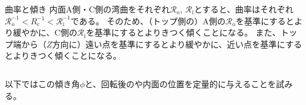 \begin{Column}{曲率と傾き}
内面A側・C側の湾曲をそれぞれ$\mathcal R_\mathrm o$, $\mathcal R_\mathrm i$とすると、曲率はそれぞれ$\mathcal R_\mathrm o^{-1} < R_\mathrm c^{-1} < \mathcal R_\mathrm i^{-1}$である。
そのため、（トップ側の）A側の$\mathcal R_\mathrm o$を基準にするとより緩やかに、C側の$\mathcal R_\mathrm i$を基準にするとよりきつく傾くことになる。
また、トップ端から（$Z$方向に）遠い点を基準にするとより緩やかに、近い点を基準にするとよりきつく傾くことになる。
\end{Column}

以下ではこの傾き角$\phi$と、回転後の\dimple や内面の位置を定量的に与えることを試みる。




